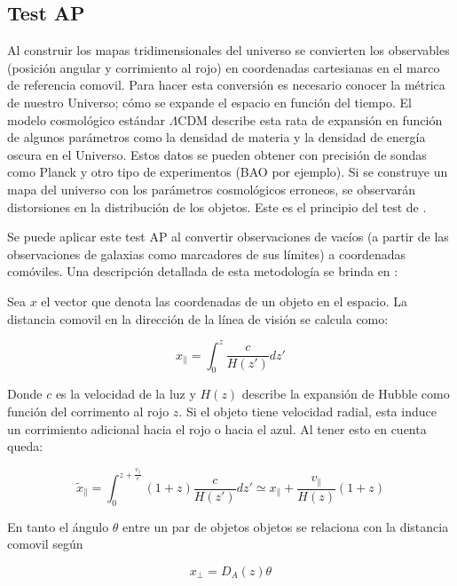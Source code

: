 \documentclass[preprint]{aastex62}
\begin{document}
  \subsection{Test AP}

  Al construir los mapas tridimensionales del universo se convierten los observables (posición
  angular y corrimiento al rojo) en coordenadas cartesianas en el marco de referencia comovil.
  Para hacer esta conversión es necesario conocer la métrica de nuestro Universo; cómo se
  expande el espacio en función del tiempo. El modelo cosmológico estándar $\Lambda$CDM
  describe esta rata de expansión en función de algunos parámetros como la densidad de materia
  y la densidad de energía oscura en el Universo. Estos datos se pueden obtener con precisión
  de sondas como Planck y otro tipo de experimentos (BAO por ejemplo). Si se construye un mapa
  del universo con los parámetros cosmológicos erroneos, se observarán
  distorsiones en la distribución de los objetos. Este es el principio del test de
  \citet{AlcockPaczynski1979}.

  Se puede aplicar este test AP al convertir observaciones de
  vacíos (a partir de las observaciones de galaxias como marcadores de sus límites) a coordenadas
  comóviles. Una descripción detallada de esta metodología se brinda en \citet{Hamaus2015}:

  Sea $x$ el vector que denota las coordenadas de un objeto en el espacio. La distancia comovil en la
  dirección de la línea de visión se calcula como:

  \begin{equation}
    x_{\parallel} = \int _0 ^z \frac{c}{H(z')}dz'
  \end{equation}

  Donde $c$ es la velocidad de la luz y $H(z)$ describe la expansión de Hubble como función del
  corrimento al rojo $z$. Si el objeto tiene velocidad radial, esta induce un corrimiento adicional
  hacia el rojo o hacia el azul. Al tener esto en cuenta queda:

  \begin{equation}
    \tilde{x}_{\parallel} = \int _0 ^{z + \frac{v_\parallel}{c}}(1+z) \frac{c}{H(z')}dz'
    \simeq x_\parallel + \frac{v_\parallel}{H(z)}(1+z)
  \end{equation}

  En tanto el ángulo $\theta$  entre un par de objetos objetos se relaciona con la distancia comovil según

  \begin{equation}
    x_{\perp} = D_A(z)\theta
  \end{equation}
  
\end{document}
